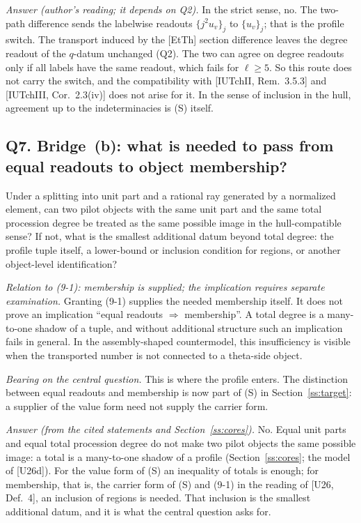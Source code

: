 \documentclass[11pt]{article}
\theoremstyle{definition}
\begin{document}
\emph{Answer (author's reading; it depends on Q2).}  In the strict
sense, no.  The two-path difference sends the labelwise readouts
$\{j^2u_v\}_j$ to $\{u_v\}_j$; that is the profile switch.  The
transport induced by the [EtTh] section difference leaves the degree
readout of the $q$-datum unchanged (Q2).  The two can agree on degree
readouts only if all labels have the same readout, which fails for
$\ell\ge5$.  So this route does not carry the switch, and the
compatibility with [IUTchII, Rem.~3.5.3] and
[IUTchIII, Cor.~2.3(iv)] does not arise for it.  In the sense of
inclusion in the hull, agreement up to the indeterminacies is (S)
itself.

\subsection*{Q7. Bridge~(b): what is needed to pass from equal readouts to object membership?}

Under a splitting into unit part and a rational ray generated by
a normalized element, can two pilot objects with the same unit
part and the same total procession degree be treated as the same
possible image in the hull-compatible sense?  If not, what is
the smallest additional datum beyond total degree: the profile
tuple itself, a lower-bound or inclusion condition for regions,
or another object-level identification?

\emph{Relation to (9-1): membership is supplied; the implication
requires separate examination.}  Granting (9-1) supplies the
needed membership itself.  It does not prove an implication
``equal readouts $\Rightarrow$ membership''.  A total degree is a
many-to-one shadow of a tuple, and without additional structure
such an implication fails in general.  In the assembly-shaped
countermodel, this insufficiency is visible when the transported
number is not connected to a theta-side object.

\emph{Bearing on the central question.}  This is where the profile
enters.  The distinction between equal readouts and membership is
now part of (S) in Section~\ref{ss:target}: a supplier of the value
form need not supply the carrier form.

\emph{Answer (from the cited statements and Section~\ref{ss:cores}).}
No.  Equal unit parts and equal total procession degree do not make
two pilot objects the same possible image: a total is a many-to-one
shadow of a profile (Section~\ref{ss:cores}; the model of [U26d]).
For the value form of (S) an inequality of totals is enough; for
membership, that is, the carrier form of (S) and (9-1) in the reading
of [U26, Def.~4], an inclusion of regions is needed.  That inclusion
is the smallest additional datum, and it is what the central question
asks for.
\end{document}
